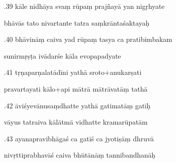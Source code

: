 \documentclass[article,12pt,a4paper]{memoir}%
\newcounter{parCount}
\begin{document}
	  
	  \pstart {}.39 kāle nidhāya svaṃ rūpaṃ prajñayā yan nigṛhyate 
	{}
	\pend%
      

	  
	  \pstart \leavevmode%
	bhāvās tato nivartante tatra saṃkrāntaśaktayaḥ 
	{}
	\pend%
      

	  
	  \pstart {}.40 bhāvināṃ caiva yad rūpaṃ tasya ca pratibimbakam 
	{}
	\pend%
      

	  
	  \pstart \leavevmode%
	sunirmṛṣṭa ivādarśe kāla evopapadyate 
	{}
	\pend%
      

	  
	  \pstart {}.41 tṛṇaparṇalatādīni yathā sroto+anukarṣati 
	{}
	\pend%
      

	  
	  \pstart \leavevmode%
	pravartayati kālo+api mātrā mātrāvatāṃ tathā 
	{}
	\pend%
      

	  
	  \pstart {}.42 āviśyevānusaṃdhatte yathā gatimatāṃ gatīḥ 
	{}
	\pend%
      

	  
	  \pstart \leavevmode%
	vāyus tatraiva kālātmā vidhatte kramarūpatām 
	{}
	\pend%
      

	  
	  \pstart {}.43 ayanapravibhāgaś ca gatīś ca jyotiṣāṃ dhruvā 
	{}
	\pend%
      

	  
	  \pstart \leavevmode%
	nivṛttiprabhavāś caiva bhūtānāṃ tannibandhanāḥ 
	{}
	\pend%
      
\end{document}

